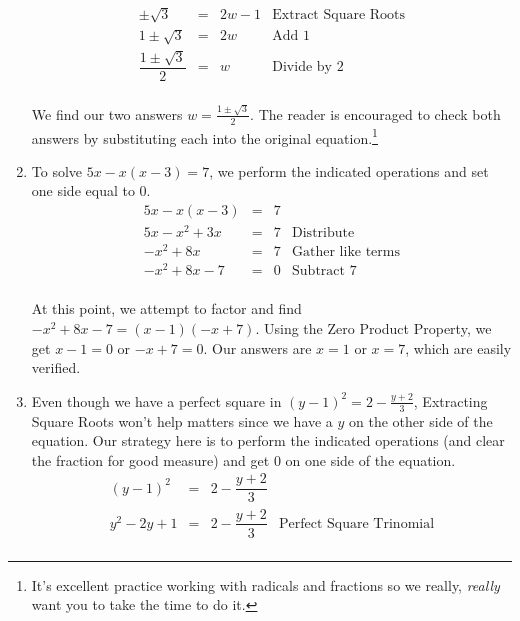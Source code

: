 \documentclass{ximera}
\begin{document}
\begin{example}
\begin{enumerate}
\[\begin{array}{rclr}
\pm \sqrt{3} & = & 2w - 1 & \text{Extract Square Roots} \\

1 \pm \sqrt{3} & = & 2w & \text{Add $1$} \\

\dfrac{1 \pm \sqrt{3}}{2} & = & w & \text{Divide by $2$} \\

\end{array} \]

We find our two answers $w = \frac{1 \pm \sqrt{3}}{2}$.  The reader is encouraged to check both answers by substituting each into the original equation.\footnote{It's excellent  practice working with radicals and fractions so we really, \emph{really} want you to take the time to do it.}

\item To solve $5x - x(x-3) = 7$, we perform the indicated operations and set one side equal to $0$.\[ \begin{array}{rclr}

5x - x(x-3) & = & 7 & \\

5x - x^2 + 3x & = & 7 & \text{Distribute} \\

-x^2 + 8x & = & 7 & \text{Gather like terms} \\

-x^2 + 8x - 7 & = & 0& \text{Subtract $7$} \\

\end{array}\]

At this point, we attempt to factor and find $-x^2 + 8x - 7 = (x-1)(-x+7)$.  Using the Zero Product Property, we get $x-1 = 0$  or $-x+7 = 0$.  Our answers are $x = 1$ or $x = 7$, which are easily verified.

\item Even though we have a perfect square in $(y-1)^2 = 2 - \frac{y+2}{3}$, Extracting Square Roots won't help matters since we have a $y$ on the other side of the equation.  Our strategy here is to perform the indicated operations (and clear the fraction for good measure) and get $0$ on one side of the equation.\[ \begin{array}{rclr}

(y-1)^2 & = &  2 - \dfrac{y+2}{3} & \\ [8pt]

y^2 - 2y + 1 & = & 2 - \dfrac{y+2}{3} & \text{Perfect Square Trinomial}\\ [8pt]


\end{array}\]
\end{enumerate}
\end{example}
\end{document}
